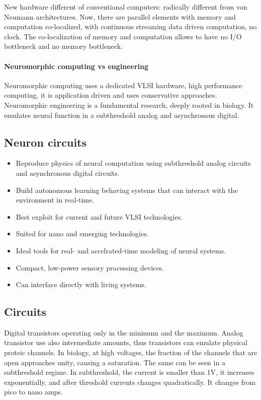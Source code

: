 \documentclass[main]{subfiles}
\begin{document}
New hardware different of conventional computers: radically different from von Neumann architectures. Now, there are parallel elements with memory and computation co-localized, with continuous streaming data driven computation, no clock. The co-localization of memory and computation allows to have no I/O bottleneck and no memory bottleneck.

\paragraph{Neuromorphic computing vs engineering}
Neuromorphic computing uses a dedicated VLSI hardware, high performance computing, it is application driven and uses conservative approaches.
Neuromorphic engineering is a fundamental research, deeply rooted in biology. It emulates neural function in a subthreshold analog and asynchronous digital.

\subsection{Neuron circuits}
\begin{itemize}[noitemsep,nolistsep]
	\item Reproduce physics of neural computation using subthreshold analog circuits and asynchronous digital circuits.
	\item Build autonomous learning behaving systems that can interact with the environment in real-time.
	\item Best exploit for current and future VLSI technologies.
	\item Suited for nano and emerging technologies.
	\item Ideal tools for real- and accelrated-time modeling of neural systems.
	\item Compact, low-power sensory processing devices.
	\item Can interface directly with living systems.
\end{itemize}

\subsection{Circuits}
Digital transistors operating only in the minimum and the maximum. Analog transistor use also intermediate amounts, thus transistors can emulate physical proteic channels. In biology, at high voltages, the fraction of the channels that are open approaches unity, causing a saturation. The same can be seen in a subthreshold regime.
In subthreshold, the current is smaller than 1V, it increases exponentially, and after threshold currents changes quadratically. It changes from pico to nano amps.
\end{document}
